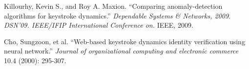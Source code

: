 \documentclass{article}
\begin{document}
\begin{thebibliography}{99}
   Killourhy, Kevin S., and Roy A. Maxion. 
   ``Comparing anomaly-detection algorithms for keystroke dynamics.''
   \textit{Dependable Systems \& Networks, 2009. DSN'09. IEEE/IFIP International Conference on.}
   IEEE, 2009. 
 
   Cho, Sungzoon, et al.
   ``Web-based keystroke dynamics identity verification using neural network.'' 
   \textit{Journal of organizational computing and electronic commerce}
   10.4 (2000): 295-307.
  
\end{thebibliography}
\end{document}

